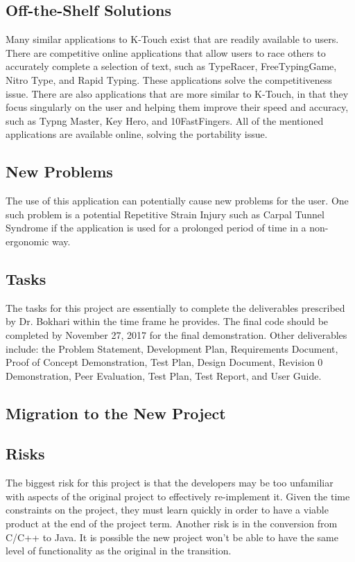 \documentclass[12pt, titlepage]{article}
\begin{document}
\subsection{Off-the-Shelf Solutions}
\indent \indent Many similar applications to K-Touch exist that are readily available to users. There are competitive online applications that allow users to race others to accurately complete a selection of text, such as TypeRacer, FreeTypingGame, Nitro Type, and Rapid Typing. These applications solve the competitiveness issue. There are also applications that are more similar to K-Touch, in that they focus singularly on the user and helping them improve their speed and accuracy, such as Typng Master, Key Hero, and 10FastFingers. All of the mentioned applications are available online, solving the portability issue.
\subsection{New Problems}
\indent \indent The use of this application can potentially cause new problems for the user. One such problem is a potential Repetitive Strain Injury such as Carpal Tunnel Syndrome if the application is used for a prolonged period of time in a non-ergonomic way. 

\subsection{Tasks}
\indent \indent The tasks for this project are essentially to complete the deliverables prescribed by Dr. Bokhari within the time frame he provides. The final code should be completed by November 27, 2017 for the final demonstration. Other deliverables include: the Problem Statement, Development Plan, Requirements Document, Proof of Concept Demonstration, Test Plan, Design Document, Revision 0 Demonstration, Peer Evaluation, Test Plan, Test Report, and User Guide.

\subsection{Migration to the New Project}


\subsection{Risks}
\indent \indent The biggest risk for this project is that the developers may be too unfamiliar with aspects of the original project to effectively re-implement it. Given the time constraints on the project, they must learn quickly in order to have a viable product at the end of the project term. Another risk is in the conversion from C/C++ to Java. It is possible the new project won't be able to have the same level of functionality as the original in the transition.
\end{document}
